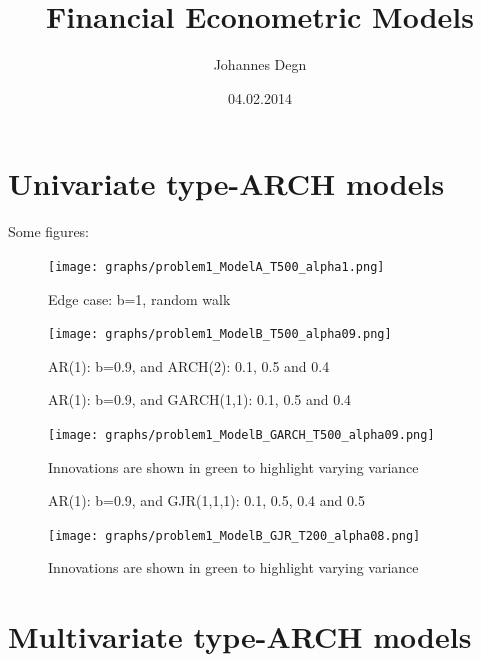 \documentclass[11pt]{article}
\title{\textbf{Financial Econometric Models}}
\author{Johannes Degn}
\date{04.02.2014}
\begin{document}
\maketitle

\section{Univariate type-ARCH models}
Some figures:
\begin{figure}[hc]
\centering
\caption{Edge case: b=1, random walk}
\label{AR1}
\texttt{[image: graphs/problem1\_ModelA\_T500\_alpha1.png]}
\end{figure}


\begin{figure}[hc]
\centering
\caption{AR(1): b=0.9, and ARCH(2): 0.1, 0.5 and 0.4 }
\label{ARCH11}
\texttt{[image: graphs/problem1\_ModelB\_T500\_alpha09.png]}
\end{figure}

\begin{figure}[hc]
\centering
\caption{AR(1): b=0.9, and GARCH(1,1): 0.1, 0.5 and 0.4}
\caption*{Innovations are shown in green to highlight varying variance}
\label{GARCH11}
\texttt{[image: graphs/problem1\_ModelB\_GARCH\_T500\_alpha09.png]}
\end{figure}

\begin{figure}[hc]
\centering
\caption{AR(1): b=0.9, and GJR(1,1,1): 0.1, 0.5, 0.4 and 0.5}
\caption*{Innovations are shown in green to highlight varying variance}
\label{GJR111}
\texttt{[image: graphs/problem1\_ModelB\_GJR\_T200\_alpha08.png]}
\end{figure}

\clearpage

\section{Multivariate type-ARCH models}
\subsection{}
\end{document}
